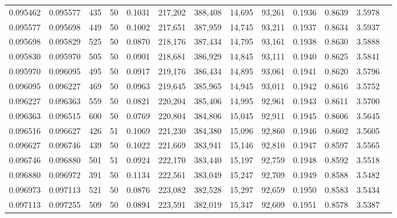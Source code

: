 \begin{tabular}{rrrrrrrrrrrrr}
0.095462 & 0.095577 &   435 &  50 &                                     0.1031 & 217,202 & 388,408 &  14,695 &  93,261 & 0.1936 & 0.8639 & 3.5978 \\
0.095577 & 0.095698 &   449 &  50 &                                     0.1002 & 217,651 & 387,959 &  14,745 &  93,211 & 0.1937 & 0.8634 & 3.5937 \\
0.095698 & 0.095829 &   525 &  50 &                                     0.0870 & 218,176 & 387,434 &  14,795 &  93,161 & 0.1938 & 0.8630 & 3.5888 \\
0.095830 & 0.095970 &   505 &  50 &                                     0.0901 & 218,681 & 386,929 &  14,845 &  93,111 & 0.1940 & 0.8625 & 3.5841 \\
0.095970 & 0.096095 &   495 &  50 &                                     0.0917 & 219,176 & 386,434 &  14,895 &  93,061 & 0.1941 & 0.8620 & 3.5796 \\
0.096095 & 0.096227 &   469 &  50 &                                     0.0963 & 219,645 & 385,965 &  14,945 &  93,011 & 0.1942 & 0.8616 & 3.5752 \\
0.096227 & 0.096363 &   559 &  50 &                                     0.0821 & 220,204 & 385,406 &  14,995 &  92,961 & 0.1943 & 0.8611 & 3.5700 \\
0.096363 & 0.096515 &   600 &  50 &                                     0.0769 & 220,804 & 384,806 &  15,045 &  92,911 & 0.1945 & 0.8606 & 3.5645 \\
0.096516 & 0.096627 &   426 &  51 &                                     0.1069 & 221,230 & 384,380 &  15,096 &  92,860 & 0.1946 & 0.8602 & 3.5605 \\
0.096627 & 0.096746 &   439 &  50 &                                     0.1022 & 221,669 & 383,941 &  15,146 &  92,810 & 0.1947 & 0.8597 & 3.5565 \\
0.096746 & 0.096880 &   501 &  51 &                                     0.0924 & 222,170 & 383,440 &  15,197 &  92,759 & 0.1948 & 0.8592 & 3.5518 \\
0.096880 & 0.096972 &   391 &  50 &                                     0.1134 & 222,561 & 383,049 &  15,247 &  92,709 & 0.1949 & 0.8588 & 3.5482 \\
0.096973 & 0.097113 &   521 &  50 &                                     0.0876 & 223,082 & 382,528 &  15,297 &  92,659 & 0.1950 & 0.8583 & 3.5434 \\
0.097113 & 0.097255 &   509 &  50 &                                     0.0894 & 223,591 & 382,019 &  15,347 &  92,609 & 0.1951 & 0.8578 & 3.5387 \\

\end{tabular}
